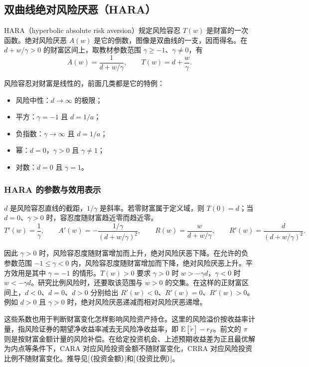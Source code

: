 \subsection{双曲线绝对风险厌恶（HARA）}\label{sec:wj-seven-hara}
\begin{tcolorbox}[knowledge]
HARA（hyperbolic absolute risk aversion）规定风险容忍 $T(w)$ 是财富的一次函数。绝对风险厌恶 $A(w)$ 是它的倒数，图像是双曲线的一支，因而得名。在 $d+w/\gamma>0$ 的财富区间上，取教材参数范围 $\gamma\ge-1$、$\gamma\ne0$，有
    \[
        A(w)=\frac{1}{d+w/\gamma},
        \qquad
        T(w)=d+\frac{w}{\gamma}.
    \]

    风险容忍对财富是线性的，前面几类都是它的特例：
    \begin{itemize}
        \item 风险中性：$d\to\infty$ 的极限；
        \item 平方：$\gamma=-1$ 且 $d=1/a$；
        \item 负指数：$\gamma\to\infty$ 且 $d=1/a$；
        \item 幂：$d=0$，$\gamma>0$ 且 $\gamma\neq 1$；
        \item 对数：$d=0$ 且 $\gamma=1$。
    \end{itemize}
\end{tcolorbox}
\subsubsection{HARA 的参数与效用表示}
$d$ 是风险容忍直线的截距，$1/\gamma$ 是斜率。若零财富属于定义域，则 $T(0)=d$；当 $d=0$、$\gamma>0$ 时，容忍度随财富趋近零而趋近零。
\[
 T'(w)=\frac1\gamma,\qquad
 A'(w)=-\frac{1/\gamma}{(d+w/\gamma)^2},\qquad
 R(w)=\frac{w}{d+w/\gamma},\qquad
 R'(w)=\frac{d}{(d+w/\gamma)^2}.
\]

因此 $\gamma>0$ 时，风险容忍度随财富增加而上升，绝对风险厌恶下降。在允许的负参数范围 $-1\le\gamma<0$ 内，风险容忍度随财富增加而下降，绝对风险厌恶上升。平方效用是其中 $\gamma=-1$ 的情形。$T(w)>0$ 要求 $\gamma>0$ 时 $w>-\gamma d$，$\gamma<0$ 时 $w<-\gamma d$。研究比例风险时，还要取该范围与 $w>0$ 的交集。在这样的正财富区间上，$d<0$、$d=0$、$d>0$ 分别给出 $R'(w)<0$、$R'(w)=0$、$R'(w)>0$。例如 $d>0$ 且 $\gamma>0$ 时，绝对风险厌恶递减而相对风险厌恶递增。

这些系数也用于判断财富变化怎样影响风险资产持仓。这里的风险溢价按收益率计量，指风险证券的期望净收益率减去无风险净收益率，即 $\mathrm E[\tilde r]-r_F$。前文的 $\pi$ 则是按财富金额计量的风险补偿。在给定投资机会、上述预期收益差为正且最优解为内点等条件下，CARA 对应风险投资金额不随财富变化，CRRA 对应风险投资比例不随财富变化。推导见[（投资金额）]和[（投资比例）]。

